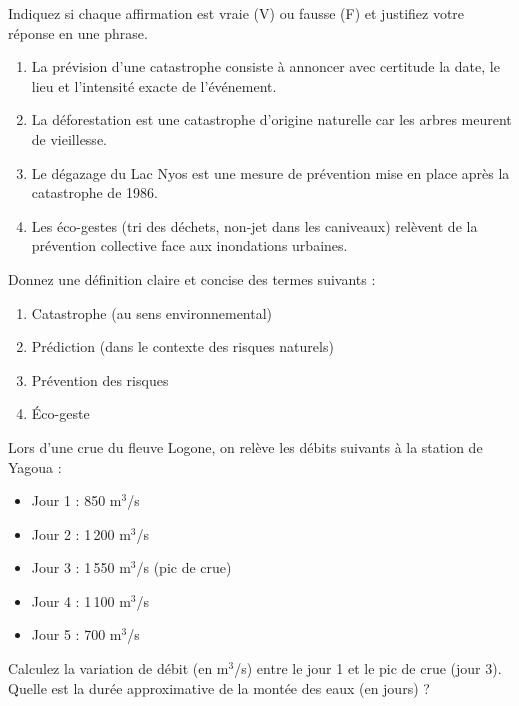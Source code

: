 \documentclass[11pt]{article}
\begin{document}
\begin{exercice}
Indiquez si chaque affirmation est vraie (V) ou fausse (F) et justifiez votre réponse en une phrase.

\begin{enumerate}
\item La prévision d'une catastrophe consiste à annoncer avec certitude la date, le lieu et l'intensité exacte de l'événement.
\item La déforestation est une catastrophe d'origine naturelle car les arbres meurent de vieillesse.
\item Le dégazage du Lac Nyos est une mesure de prévention mise en place après la catastrophe de 1986.
\item Les éco-gestes (tri des déchets, non-jet dans les caniveaux) relèvent de la prévention collective face aux inondations urbaines.
\end{enumerate}
\end{exercice}

\begin{exercice}
Donnez une définition claire et concise des termes suivants :
\begin{enumerate}
\item Catastrophe (au sens environnemental)
\item Prédiction (dans le contexte des risques naturels)
\item Prévention des risques
\item Éco-geste
\end{enumerate}
\end{exercice}

\begin{exercice}
Lors d'une crue du fleuve Logone, on relève les débits suivants à la station de Yagoua :
\begin{itemize}
\item Jour 1 : 850 m$^3$/s
\item Jour 2 : 1\,200 m$^3$/s
\item Jour 3 : 1\,550 m$^3$/s (pic de crue)
\item Jour 4 : 1\,100 m$^3$/s
\item Jour 5 : 700 m$^3$/s
\end{itemize}
Calculez la variation de débit (en m$^3$/s) entre le jour 1 et le pic de crue (jour 3). Quelle est la durée approximative de la montée des eaux (en jours) ?
\end{exercice}
\end{document}
